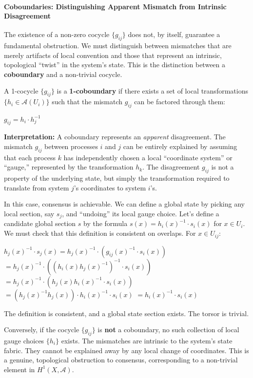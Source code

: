 \documentclass[
]{article}
\begin{document}
\paragraph{Coboundaries: Distinguishing Apparent Mismatch from Intrinsic
Disagreement}\label{coboundaries-distinguishing-apparent-mismatch-from-intrinsic-disagreement}

The existence of a non-zero cocycle \(\{g_{ij}\}\) does not, by itself,
guarantee a fundamental obstruction. We must distinguish between
mismatches that are merely artifacts of local convention and those that
represent an intrinsic, topological ``twist'' in the system's state.
This is the distinction between a \textbf{coboundary} and a non-trivial
cocycle.

A 1-cocycle \(\{g_{ij}\}\) is a \textbf{1-coboundary} if there exists a
set of local transformations \(\{h_i \in \mathcal{A}(U_i)\}\) such that
the mismatch \(g_{ij}\) can be factored through them:

\(g_{ij} = h_i \cdot h_j^{-1}\)

\textbf{Interpretation:} A coboundary represents an \emph{apparent}
disagreement. The mismatch \(g_{ij}\) between processes \(i\) and \(j\)
can be entirely explained by assuming that each process \(k\) has
independently chosen a local ``coordinate system'' or ``gauge,''
represented by the transformation \(h_k\). The disagreement \(g_{ij}\)
is not a property of the underlying state, but simply the transformation
required to translate from system \(j\)'s coordinates to system \(i\)'s.

In this case, consensus is achievable. We can define a global state by
picking any local section, say \(s_j\), and ``undoing'' its local gauge
choice. Let's define a candidate global section \(s\) by the formula
\(s(x) = h_i(x)^{-1} \cdot s_i(x)\) for \(x \in U_i\). We must check
that this definition is consistent on overlaps. For \(x \in U_{ij}\):

\(h_j(x)^{-1} \cdot s_j(x) = h_j(x)^{-1} \cdot (g_{ij}(x)^{-1} \cdot s_i(x))\)
\(= h_j(x)^{-1} \cdot ((h_i(x)h_j(x)^{-1})^{-1} \cdot s_i(x))\)
\(= h_j(x)^{-1} \cdot (h_j(x)h_i(x)^{-1} \cdot s_i(x))\)
\(= (h_j(x)^{-1}h_j(x)) \cdot h_i(x)^{-1} \cdot s_i(x)\)
\(= h_i(x)^{-1} \cdot s_i(x)\)

The definition is consistent, and a global state section exists. The
torsor is trivial.

Conversely, if the cocycle \(\{g_{ij}\}\) is \textbf{not} a coboundary,
no such collection of local gauge choices \(\{h_i\}\) exists. The
mismatches are intrinsic to the system's state fabric. They cannot be
explained away by any local change of coordinates. This is a genuine,
topological obstruction to consensus, corresponding to a non-trivial
element in \(H^1(X, \mathcal{A})\).
\end{document}
